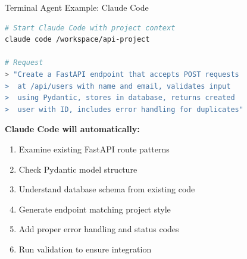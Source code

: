 \documentclass[aspectratio=169,11pt]{beamer}
\begin{document}
\begin{frame}[fragile]{Terminal Agent Example: Claude Code}
    \begin{lstlisting}[language=bash, title=Starting Claude Code]
# Start Claude Code with project context
claude code /workspace/api-project

# Request
> "Create a FastAPI endpoint that accepts POST requests
>  at /api/users with name and email, validates input
>  using Pydantic, stores in database, returns created
>  user with ID, includes error handling for duplicates"
    \end{lstlisting}

    \vspace{0.3cm}
    \textbf{Claude Code will automatically:}
    \begin{enumerate}
        \item Examine existing FastAPI route patterns
        \item Check Pydantic model structure
        \item Understand database schema from existing code
        \item Generate endpoint matching project style
        \item Add proper error handling and status codes
        \item Run validation to ensure integration
    \end{enumerate}

\end{frame}
\end{document}
